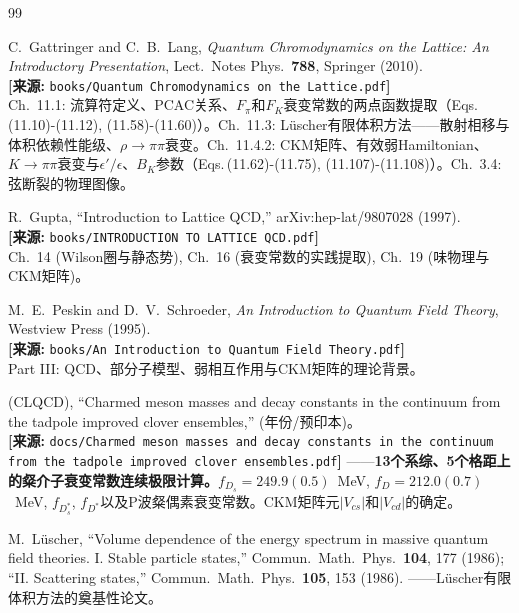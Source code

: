 \documentclass[12pt,a4paper]{ctexart}
\theoremstyle{definition}
\begin{document}
\begin{thebibliography}{99}

C.~Gattringer and C.~B.~Lang,
\textit{Quantum Chromodynamics on the Lattice: An Introductory Presentation},
Lect.\ Notes Phys.\ \textbf{788}, Springer (2010).
\\\textbf{[来源:} \texttt{books/Quantum Chromodynamics on the Lattice.pdf}\textbf{]}
\\Ch.~11.1: 流算符定义、PCAC关系、$F_\pi$和$F_K$衰变常数的两点函数提取（Eqs.\,(11.10)-(11.12), (11.58)-(11.60)）。Ch.~11.3: L\"uscher有限体积方法——散射相移与体积依赖性能级、$\rho\to\pi\pi$衰变。Ch.~11.4.2: CKM矩阵、有效弱Hamiltonian、$K\to\pi\pi$衰变与$\epsilon'/\epsilon$、$B_K$参数（Eqs.\,(11.62)-(11.75), (11.107)-(11.108)）。Ch.~3.4: 弦断裂的物理图像。

R.~Gupta,
``Introduction to Lattice QCD,''
arXiv:hep-lat/9807028 (1997).
\\\textbf{[来源:} \texttt{books/INTRODUCTION TO LATTICE QCD.pdf}\textbf{]}
\\Ch.~14 (Wilson圈与静态势), Ch.~16 (衰变常数的实践提取), Ch.~19 (味物理与CKM矩阵)。

M.~E.~Peskin and D.~V.~Schroeder,
\textit{An Introduction to Quantum Field Theory},
Westview Press (1995).
\\\textbf{[来源:} \texttt{books/An Introduction to Quantum Field Theory.pdf}\textbf{]}
\\Part III: QCD、部分子模型、弱相互作用与CKM矩阵的理论背景。

(CLQCD),
``Charmed meson masses and decay constants in the continuum from the tadpole improved clover ensembles,''
(年份/预印本)。
\\\textbf{[来源:} \texttt{docs/Charmed meson masses and decay constants in the continuum from the tadpole improved clover ensembles.pdf}\textbf{]}
——\textbf{13个系综、5个格距上的粲介子衰变常数连续极限计算。}$f_{D_s}=249.9(0.5)$~MeV, $f_D=212.0(0.7)$~MeV, $f_{D_s^*}$, $f_{D^*}$以及P波粲偶素衰变常数。CKM矩阵元$|V_{cs}|$和$|V_{cd}|$的确定。

M.~L\"uscher,
``Volume dependence of the energy spectrum in massive quantum field theories. I. Stable particle states,''
Commun.\ Math.\ Phys.\ \textbf{104}, 177 (1986);
``II. Scattering states,'' Commun.\ Math.\ Phys.\ \textbf{105}, 153 (1986).
——L\"uscher有限体积方法的奠基性论文。


\end{thebibliography}
\end{document}
